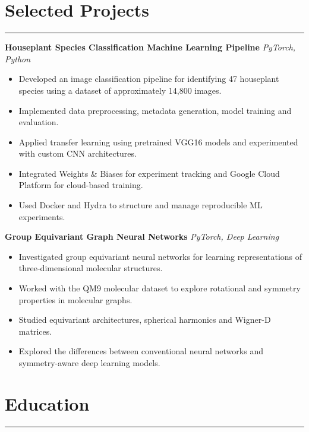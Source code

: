 \documentclass[letterpaper, 10pt]{article}
\begin{document}
\section*{Selected Projects}
\hrule
\vspace{4pt}

\textbf{Houseplant Species Classification Machine Learning Pipeline}
\hfill \textit{PyTorch, Python}
\begin{itemize}
    \item Developed an image classification pipeline for
    identifying 47 houseplant species using a dataset of
    approximately 14,800 images.
    \item Implemented data preprocessing, metadata generation,
    model training and evaluation.
    \item Applied transfer learning using pretrained VGG16 models and experimented with custom CNN architectures.
    \item Integrated Weights \& Biases for experiment tracking and Google Cloud Platform for cloud-based training.
    \item Used Docker and Hydra to structure and manage
    reproducible ML experiments.
\end{itemize}

\vspace{4pt}

\textbf{Group Equivariant Graph Neural Networks}
\hfill \textit{PyTorch, Deep Learning}
\begin{itemize}
    \item Investigated group equivariant neural networks
    for learning representations of three-dimensional
    molecular structures.
    \item Worked with the QM9 molecular dataset to explore rotational and symmetry properties in molecular graphs.
    \item Studied equivariant architectures, spherical
    harmonics and Wigner-D matrices.
    \item Explored the differences between conventional
    neural networks and symmetry-aware deep learning models.
\end{itemize}


\section*{Education}
\hrule
\vspace{4pt}
\end{document}

